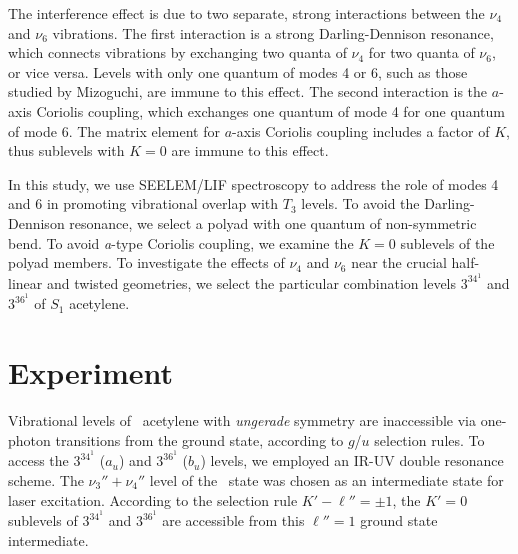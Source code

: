 The interference effect is due to two separate, strong interactions
between the $\nu_4$ and $\nu_6$ vibrations.  The first interaction is
a strong Darling-Dennison resonance, which connects vibrations by
exchanging two quanta of $\nu_4$ for two quanta of $\nu_6$, or vice
versa.  Levels with only one quantum of modes 4 or 6, such as those
studied by Mizoguchi, are immune to this effect.  The second
interaction is the $a$-axis Coriolis coupling, which exchanges one
quantum of mode 4 for one quantum of mode 6.  The matrix element for
$a$-axis Coriolis coupling includes a factor of $K$, thus sublevels
with $K=0$ are immune to this effect.

In this study, we use SEELEM/LIF spectroscopy to address the role of
modes 4 and 6 in promoting vibrational overlap with $T_3$ levels.  To
avoid the Darling-Dennison resonance, we select a polyad with one
quantum of non-symmetric bend.  To avoid \emph{a}-type Coriolis
coupling, we examine the $K=0$ sublevels of the polyad members.  To
investigate the effects of $\nu_4$ and $\nu_6$ near the crucial
half-linear and twisted geometries, we select the particular
combination levels $3^34^1$ and $3^36^1$ of $S_1$ acetylene.





























\section{Experiment}

Vibrational levels of \astate\ acetylene with \emph{ungerade}
symmetry are inaccessible via one-photon transitions from the ground
state, according to $g$/$u$ selection rules.  To access the $3^34^1$
($a_u$) and $3^36^1$ ($b_u$) levels, we employed an IR-UV double
resonance scheme.  The $\nu_3''+\nu_4''$ level of the \xstate\ state
was chosen as an intermediate state for laser excitation.  According
to the selection rule $K'-\ell'' = \pm 1$, the $K'=0$ sublevels of
$3^34^1$ and $3^36^1$ are accessible from this $\ell''=1$ ground state
intermediate.

